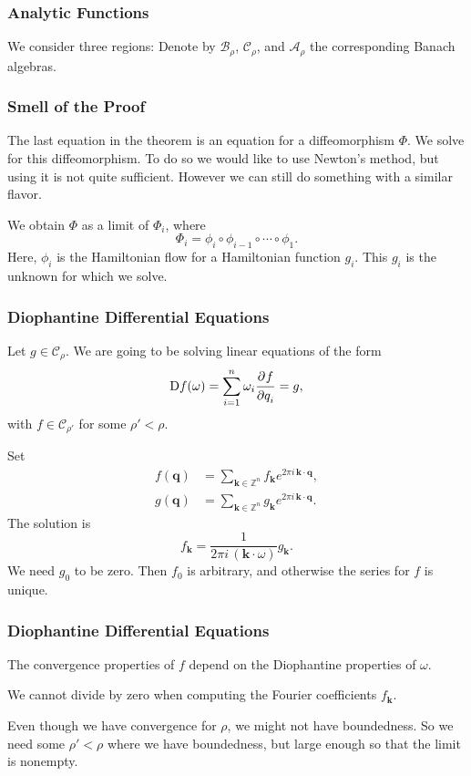 \documentclass{beamer}
\newcommand{\Z}{\mathbb{Z}}
\newcommand{\bp}[1]{\bm{#1}}
\newcommand{\Dif}{\mathop{}\!\mathrm{D}}
\newcommand\pd[3][]{\frac{\strut\partial^{#1}#2}{\strut\partial#3^{#1}}}
\begin{document}
\begin{frame}
  \frametitle{Analytic Functions}
  We consider three regions:
  \domains{}
  Denote by $\mathcal{B}_\rho$, $\mathcal{C}_\rho$, and $\mathcal{A}_\rho$ the
  corresponding Banach algebras.
\end{frame}

\begin{frame}
  \frametitle{Smell of the Proof}
  The last equation in the theorem is an equation for a diffeomorphism $\Phi$.
  We solve for this diffeomorphism.
  To do so we would like to use Newton's method, but using it is not quite
  sufficient.
  However we can still do something with a similar flavor.

  We obtain $\Phi$ as a limit of $\Phi_i$, where
  \begin{equation*}
    \Phi_i = \phi_i \circ \phi_{i-1} \circ \cdots \circ \phi_1.
  \end{equation*}
  Here, $\phi_i$ is the Hamiltonian flow for a Hamiltonian function $g_i$.
  This $g_i$ is the unknown for which we solve.
\end{frame}

\begin{frame}
  \frametitle{Diophantine Differential Equations}
  Let $g \in \mathcal{C}_\rho$.
  We are going to be solving linear equations of the form
  \begin{equation*}
    \Dif f(\omega) = \sum_{i = 1}^n \omega_i \pd{f}{q_i} = g,
  \end{equation*}
  with $f \in \mathcal{C}_{\rho'}$ for some $\rho' < \rho$.

  Set
  \begin{align*}
    f(\bp{q}) &= \sum_{\bp{k} \in \Z^n} f_{\bp{k}} e^{2 \pi i \, \bp{k} \cdot
      \bp{q}},\\
    g(\bp{q}) &= \sum_{\bp{k} \in \Z^n} g_{\bp{k}} e^{2 \pi i \, \bp{k} \cdot \bp{q}}.
  \end{align*}
  The solution is
  \begin{equation*}
    f_{\bp{k}} = \frac{1}{2 \pi i \, (\bp{k} \cdot \omega)} g_{\bp{k}}.
  \end{equation*}
  We need $g_0$ to be zero.
  Then $f_0$ is arbitrary, and otherwise the series for $f$ is unique.
\end{frame}

\begin{frame}
  \frametitle{Diophantine Differential Equations}
  The convergence properties of $f$ depend on the Diophantine properties of
  $\omega$.

  We cannot divide by zero when computing the Fourier coefficients $f_{\bp{k}}$.
  
  Even though we have convergence for $\rho$, we might not have boundedness.
  So we need some $\rho' < \rho$ where we have boundedness, but large enough so
  that the limit is nonempty.
\end{frame}
\end{document}
